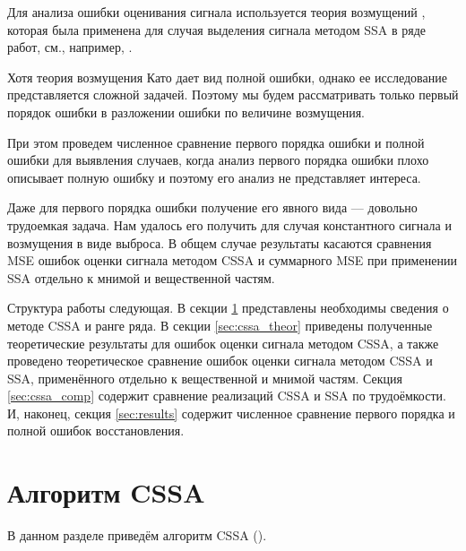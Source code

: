 \documentclass[12pt,a4paper]{article}
\begin{document}
Для анализа ошибки оценивания сигнала используется теория возмущений \cite{Kato}, которая была применена для случая выделения сигнала методом SSA в ряде работ, см., например, \cite{Nekrutkin}.

Хотя теория возмущения Като дает вид полной ошибки, однако ее исследование представляется сложной задачей. Поэтому мы будем рассматривать только первый порядок ошибки в разложении ошибки по величине возмущения.

При этом проведем численное сравнение первого порядка ошибки и полной ошибки для выявления случаев, когда анализ первого порядка ошибки плохо описывает полную ошибку и поэтому его анализ не представляет интереса.

Даже для первого порядка ошибки получение его явного вида --- довольно трудоемкая задача. Нам удалось его получить для случая константного сигнала и возмущения в виде выброса. В общем случае результаты касаются сравнения MSE ошибок оценки сигнала методом CSSA и суммарного MSE при применении SSA отдельно к мнимой и вещественной частям.

Структура работы следующая. В секции \ref{sec:basessa} представлены необходимы сведения о методе CSSA и ранге ряда. В секции \ref{sec:cssa_theor} приведены полученные теоретические результаты для ошибок оценки сигнала методом CSSA, а также проведено теоретическое сравнение ошибок оценки сигнала методом CSSA и SSA, применённого отдельно к вещественной и мнимой частям. Секция \ref{sec:cssa_comp} содержит сравнение реализаций CSSA и SSA по трудоёмкости. И, наконец, секция \ref{sec:results} содержит численное сравнение первого порядка и полной ошибок восстановления.



\section{Алгоритм CSSA}
\label{sec:basessa}

В данном разделе приведём алгоритм CSSA (\cite{Golyandina.etal2001}).
\end{document}
